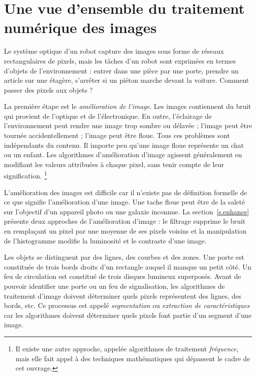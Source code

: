 \section{Une vue d'ensemble du traitement numérique des images}\label{s.image-overview}

Le système optique d'un robot capture des images sous forme de réseaux rectangulaires de pixels, mais les tâches d'un robot sont exprimées en termes d'objets de l'environnement : entrer dans une pièce par une porte, prendre un article sur une étagère, s'arrêter si un piéton marche devant la voiture. Comment passer des pixels aux objets ?

La première étape est le \emph{amélioration de l'image}. Les images contiennent du bruit qui provient de l'optique et de l'électronique. En outre, l'éclairage de l'environnement peut rendre une image trop sombre ou délavée ; l'image peut être tournée accidentellement ; l'image peut être floue. Tous ces problèmes sont indépendants du contenu. Il importe peu qu'une image floue représente un chat ou un enfant. Les algorithmes d'amélioration d'image agissent généralement en modifiant les valeurs attribuées à chaque pixel, sans tenir compte de leur signification. \footnote{Il existe une autre approche, appelée algorithmes de traitement \emph{fréquence}, mais elle fait appel à des techniques mathématiques qui dépassent le cadre de cet ouvrage.}

L'amélioration des images est difficile car il n'existe pas de définition formelle de ce que signifie l'amélioration d'une image. Une tache floue peut être de la saleté sur l'objectif d'un appareil photo ou une galaxie inconnue. La section~\ref{s.enhance} présente deux approches de l'amélioration d'image : le filtrage supprime le bruit en remplaçant un pixel par une moyenne de ses pixels voisins et la manipulation de l'histogramme modifie la luminosité et le contraste d'une image.

Les objets se distinguent par des lignes, des courbes et des zones. Une porte est constituée de trois bords droits d'un rectangle auquel il manque un petit côté. Un feu de circulation est constitué de trois disques lumineux superposés. Avant de pouvoir identifier une porte ou un feu de signalisation, les algorithmes de traitement d'image doivent déterminer quels pixels représentent des lignes, des bords, etc. Ce processus est appelé \emph{segmentation} ou \emph{extraction de caractéristiques} car les algorithmes doivent déterminer quels pixels font partie d'un segment d'une image.


